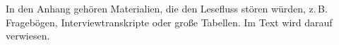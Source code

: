 \addchap{\appendixname}

In den Anhang gehören Materialien, die den Lesefluss stören würden, z.\,B.
Fragebögen, Interviewtranskripte oder große Tabellen. Im Text wird darauf verwiesen.
